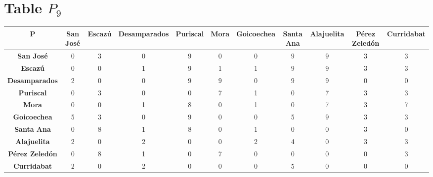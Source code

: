 \documentclass{article}
\begin{document}
\section{Table $P_{9}$}
\begin{center}
    \begin{tabular}{|c||c|c|c|c|c|c|c|c|c|c|}
        \hline
        \textbf{P} & \textbf{San José} & \textbf{Escazú} & \textbf{Desamparados} & \textbf{Puriscal} & \textbf{Mora} & \textbf{Goicoechea} & \textbf{Santa Ana} & \textbf{Alajuelita} & \textbf{Pérez Zeledón} & \textbf{Curridabat} \\
        \hline
        \hline
        \textbf{San José}& 0 & 3 & 0 & \cellcolor[HTML]{D74894}$9$ & 0 & 0 & \cellcolor[HTML]{D74894}$9$ & \cellcolor[HTML]{D74894}$9$ & 3 & 3 \\
        \hline
        \textbf{Escazú}& 0 & 0 & 1 & \cellcolor[HTML]{D74894}$9$ & 1 & 1 & \cellcolor[HTML]{D74894}$9$ & \cellcolor[HTML]{D74894}$9$ & 3 & 3 \\
        \hline
        \textbf{Desamparados}& 2 & 0 & 0 & \cellcolor[HTML]{D74894}$9$ & \cellcolor[HTML]{D74894}$9$ & 0 & \cellcolor[HTML]{D74894}$9$ & \cellcolor[HTML]{D74894}$9$ & 0 & 0 \\
        \hline
        \textbf{Puriscal}& 0 & 3 & 0 & 0 & 7 & 1 & 0 & 7 & 3 & 3 \\
        \hline
        \textbf{Mora}& 0 & 0 & 1 & 8 & 0 & 1 & 0 & 7 & 3 & 7 \\
        \hline
        \textbf{Goicoechea}& 5 & 3 & 0 & \cellcolor[HTML]{D74894}$9$ & 0 & 0 & 5 & \cellcolor[HTML]{D74894}$9$ & 3 & 3 \\
        \hline
        \textbf{Santa Ana}& 0 & 8 & 1 & 8 & 0 & 1 & 0 & 0 & 3 & 0 \\
        \hline
        \textbf{Alajuelita}& 2 & 0 & 2 & 0 & 0 & 2 & 4 & 0 & 3 & 3 \\
        \hline
        \textbf{Pérez Zeledón}& 0 & 8 & 1 & 0 & 7 & 0 & 0 & 0 & 0 & 3 \\
        \hline
        \textbf{Curridabat}& 2 & 0 & 2 & 0 & 0 & 0 & 5 & 0 & 0 & 0 \\
        \hline
    \end{tabular}
\end{center}
\end{document}
